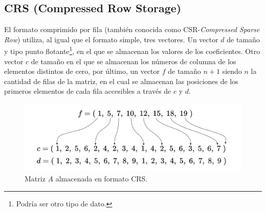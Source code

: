 \subsection{CRS (Compressed Row Storage)}

El formato comprimido por fila (también conocida como CSR-\textit{Compressed Sparse Row}) utiliza, al igual que el formato simple, tres vectores.
 Un vector $d$ de tamaño \nnz y tipo punto flotante\footnote{Podría ser otro tipo de dato.}, en el que se almacenan los valores de los coeficientes.
 Otro vector $c$ de tamaño \nnz en el que se almacenan los n\'umeros de columna de los elementos distintos de cero,  por \'ultimo, un vector $f$ de tamaño $n+1$ siendo $n$ la cantidad de filas de la matriz, en el cual se almacenan las posiciones de los primeros elementos de cada fila accesibles a través de $c$ y $d$.


\begin{figure}[h] 
\begin{center}
\includegraphics[width=\textwidth]{imagenes/chapter2/csr-format.jpg}
\end{center}
\caption{Matriz $A$ almacenada en formato CRS.}
\label{crs-matrix}
\end{figure}


